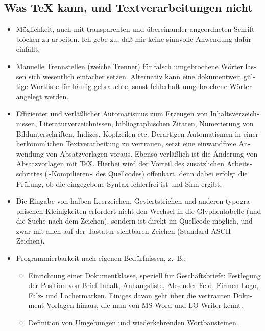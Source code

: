 \documentclass[11pt,a4paper,ngerman,french,DIV=8]{scrartcl}
\begin{document}
\begin{otherlanguage}{ngerman}
\section{Was \TeX{} kann, und Textverarbeitungen nicht}

\begin{itemize}
  \item Möglichkeit, auch mit transparenten und übereinander angeordneten Schriftblöcken zu arbeiten. Ich gebe zu, daß mir keine sinnvolle Anwendung dafür einfällt.
  \item Manuelle Trennstellen (weiche Trenner) für falsch umgebrochene Wörter lassen sich wesentlich einfacher setzen. Alternativ kann eine dokumentweit gültige Wortliste für häufig gebrauchte, sonst fehlerhaft umgebrochene Wörter angelegt werden.
  \item Effizienter und verläßlicher Automatismus zum Erzeugen von Inhaltsverzeichnissen, Literaturverzeichnissen, bibliographischen Zitaten, Numerierung von Bildunterschriften, Indizes, Kopfzeilen etc. Derartigen Automatismen in einer herkömmlichen Textverarbeitung zu vertrauen, setzt eine einwandfreie Anwendung von Absatzvorlagen voraus. Ebenso verläßlich ist die Änderung von Absatzvorlagen mit \TeX{}. Hierbei wird der Vorteil des zusätzlichen Arbeitsschrittes (»Kompilieren« des Quellcodes) offenbart, denn dabei erfolgt die Prüfung, ob die eingegebene Syntax fehlerfrei ist und Sinn ergibt.
  \item Die Eingabe von halben Leerzeichen, Geviertstrichen und anderen typographischen Kleinigkeiten erfordert nicht den Wechsel in die Glyphentabelle (und die Suche nach dem Zeichen), sondern ist direkt im Quellcode möglich, und zwar mit allen auf der Tastatur sichtbaren Zeichen (Standard-ASCII-Zeichen).
  \item Programmierbarkeit nach eigenen Bedürfnissen, z.~B.:
  \begin{itemize}
    \item Einrichtung einer Dokumentklasse, speziell für Geschäftsbriefe: Festlegung der Position von Brief-Inhalt, Anhangsliste, Absender-Feld, Firmen-Logo, Falz- und Lochermarken. Einiges davon geht über die vertrauten Dokument-Vorlagen hinaus, die man von MS Word und LO Writer kennt.
    \item Definition von Umgebungen und wiederkehrenden Wortbausteinen.
  \end{itemize}

\end{itemize}
\end{otherlanguage}
\end{document}
